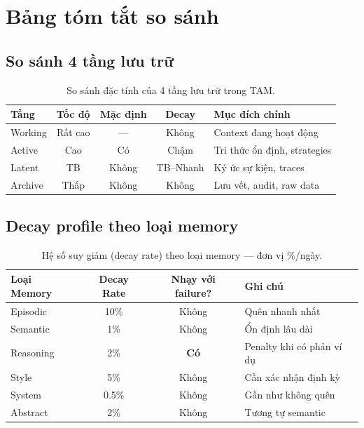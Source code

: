 \documentclass[a4paper,12pt]{article}
\begin{document}
\section{Bảng tóm tắt so sánh}

\subsection*{So sánh 4 tầng lưu trữ}

\begin{table}[H]
\centering
\caption{So sánh đặc tính của 4 tầng lưu trữ trong TAM.}
\label{tab:tiers}
\begin{tabularx}{\textwidth}{l c c c X}
\toprule
\textbf{Tầng} & \textbf{Tốc độ} & \textbf{Mặc định} & \textbf{Decay} & \textbf{Mục đích chính} \\
\midrule
Working  & \textcolor{tamgreen}{Rất cao} & --- & Không & Context đang hoạt động \\
Active   & \textcolor{tamblue}{Cao}     & Có  & Chậm  & Tri thức ổn định, strategies \\
Latent   & \textcolor{tamorange}{TB}     & Không & TB--Nhanh & Ký ức sự kiện, traces \\
Archive  & \textcolor{tamred}{Thấp}      & Không & Không & Lưu vết, audit, raw data \\
\bottomrule
\end{tabularx}
\end{table}

\subsection*{Decay profile theo loại memory}

\begin{table}[H]
\centering
\caption{Hệ số suy giảm (decay rate) theo loại memory --- đơn vị \%/ngày.}
\label{tab:decay}
\begin{tabular}{lccl}
\toprule
\textbf{Loại Memory} & \textbf{Decay Rate} & \textbf{Nhạy với failure?} & \textbf{Ghi chú} \\
\midrule
Episodic  & 10\%  & Không & Quên nhanh nhất \\
Semantic  & 1\%   & Không & Ổn định lâu dài \\
Reasoning & 2\%   & \textbf{Có} & Penalty khi có phản ví dụ \\
Style     & 5\%   & Không & Cần xác nhận định kỳ \\
System    & 0.5\% & Không & Gần như không quên \\
Abstract  & 2\%   & Không & Tương tự semantic \\
\bottomrule
\end{tabular}
\end{table}
\end{document}
